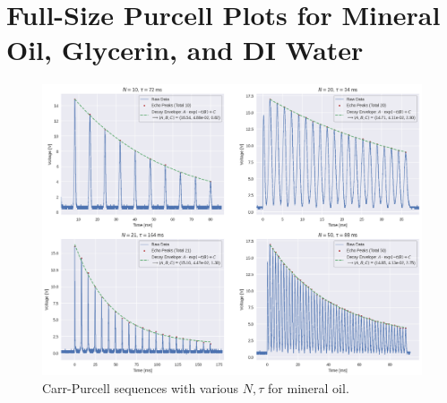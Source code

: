\documentclass[
    floatfix,  %
    reprint,
    amsmath,
    amssymb,
    aps,
]{revtex4-2}
\begin{document}












\clearpage

\onecolumngrid
\appendix
\section{Full-Size Purcell Plots for Mineral Oil, Glycerin, and DI Water}

\begin{figure}[htbp]
    \centering
    \includegraphics[width=\textwidth]{figs/purcell/mineral_oil.png}
    \caption{Carr-Purcell sequences with various $N, \tau$ for mineral oil.}
    \label{fig:purcell/mineral_oil}
\end{figure}
\end{document}
